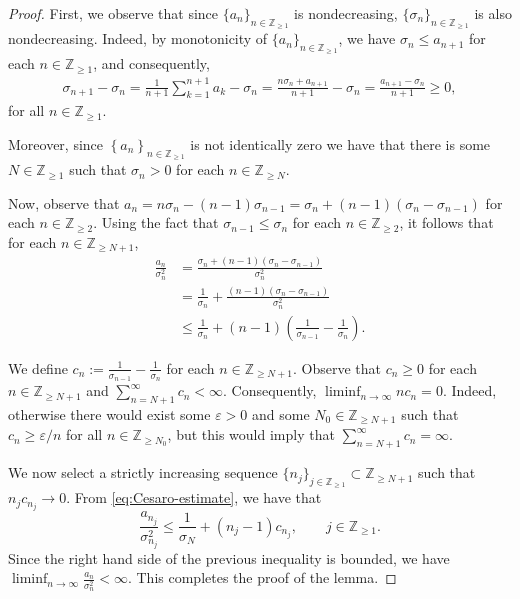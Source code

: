 \documentclass[10pt,a4paper]{amsart}
\newcommand{\Z}{\mathbb Z}
\renewcommand{\ge}{\geqslant}
\renewcommand{\le}{\leqslant}
\begin{document}
\begin{proof}
    First, we observe that since $\{ a_n \}_{n \in \Z_{\ge1}}$ is nondecreasing, $\{ \sigma_{n} \}_{n \in \Z_{\ge 1}}$ is also nondecreasing. Indeed, by monotonicity of $\{ a_n \}_{n \in \Z_{\ge1}}$, we have $\sigma_n \le a_{n+1}$ for each $n \in \Z_{\ge 1}$, and consequently,
    \begin{equation*}
        \begin{aligned}
            \sigma_{n+1} - \sigma_n = \frac{1}{n+1} \sum_{k=1}^{n+1} a_k - \sigma_n 
                                    = \frac{n \sigma_n + a_{n+1}}{n+1} - \sigma_n 
                                    = \frac{a_{n+1} - \sigma_n}{n+1} \ge 0,
        \end{aligned}
    \end{equation*}
    for all $n \in \Z_{\ge 1}$.

    Moreover, since $\left\{ a_n \right\}_{n \in \Z_{\ge 1}}$ is not identically zero we have that there is some $N \in \Z_{\ge 1}$ such that $\sigma_n > 0$ for each $n \in \Z_{\ge N}$.

    Now, observe that $a_n = n \sigma_n - (n-1) \sigma_{n-1} = \sigma_n + (n-1) (\sigma_n - \sigma_{n-1})$ for each $n \in \Z_{\ge 2}$. Using the fact that $\sigma_{n-1} \le \sigma_{n}$ for each $n \in \Z_{\ge 2}$, it follows that for each $n \in \Z_{\ge N+1}$,
    \begin{equation}
        \begin{aligned}
        \frac{a_n}{\sigma_n ^2} &= \frac{\sigma_n + (n-1) (\sigma_n - \sigma_{n-1})}{\sigma_n ^2} \\
        &= \frac{1}{\sigma_n} + \frac{(n-1) (\sigma_n - \sigma_{n-1})}{\sigma_{n} ^2} \\
        &\le \frac{1}{\sigma_n} + (n-1) \left( \frac{1}{\sigma_{n-1}} - \frac{1}{\sigma_n} \right).
    \end{aligned}
    \label{eq:Cesaro-estimate}
    \end{equation}
    
    We define $c_n := \frac{1}{\sigma_{n-1}} - \frac{1}{\sigma_n}$ for each $n \in \Z_{\ge N+1}$. Observe that $c_n \ge 0$ for each $n \in \Z_{\ge N+1}$ and $\sum_{n = N+1}^{\infty} c_n < \infty$. Consequently, $\liminf_{n \to \infty} nc_n = 0$. Indeed, otherwise there would exist some $\varepsilon > 0$ and some $N_0 \in \Z_{\ge N+1}$ such that $c_n \ge \varepsilon/n$ for all $n \in \Z_{\ge N_0}$, but this would imply that $\sum_{n = N+1}^{\infty} c_n = \infty$.

    We now select a strictly increasing sequence $\{ n_j \}_{j \in \Z_{\ge 1}} \subset \Z_{\ge N+1}$ such that $n_j c_{n_j} \to 0$. From \eqref{eq:Cesaro-estimate}, we have that 
    \begin{equation*}
        \frac{a_{n_j}}{\sigma_{n_j} ^2} \le \frac{1}{\sigma_N} + (n_j - 1) c_{n_j}, \qquad j \in \Z_{\ge 1}.
    \end{equation*}
    Since the right hand side of the previous inequality is bounded, we have $\liminf_{n \to \infty} \frac{a_{n}}{\sigma_{n} ^2} < \infty$. This completes the proof of the lemma.
\end{proof}
\end{document}
